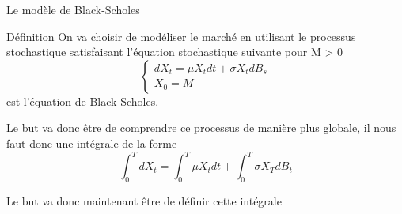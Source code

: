 \documentclass{beamer}
\newcommand{\1}{\mathmybb{1}}
\begin{document}
\begin{frame}{Le modèle de Black-Scholes}
  \begin{block}{Définition}
    On va choisir de modéliser le marché en utilisant le processus stochastique satisfaisant l'équation stochastique suivante pour M > 0
    \begin{equation}
      \begin{cases}
        dX_{t} = \mu X_{t} dt + \sigma X_{t} dB_{s} \\
        X_{0} = M
      \end{cases}
      \end{equation}
      est l'équation de Black-Scholes. \\
    \end{block}
    \pause
    \begin{alertblock}{}
    Le but va donc être de comprendre ce processus de manière plus globale, il nous faut donc une intégrale de la forme
    \[
      \int_0^{T} dX_{t} = \int_0^{T} \mu X_{t} dt + \int_{0}^{T} \sigma X_{T} dB_{t}
    \]
  \end{alertblock}
  \pause
  Le but va donc maintenant être de définir cette intégrale
\end{frame}
\end{document}

